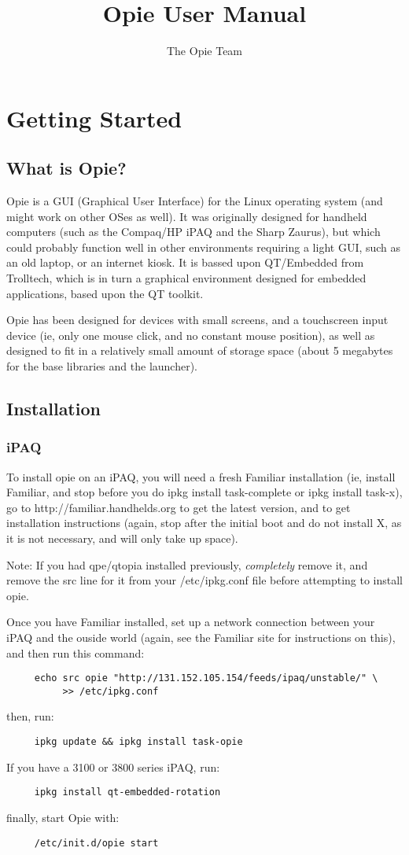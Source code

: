 \documentclass[12pt,letterpaper,oneside, openany]{book} \usepackage[latin1] {inputenc}
\title{Opie User Manual}
\author{The Opie Team}
\begin{document}
\maketitle
\tableofcontents
\part{Getting Started}
\chapter{What is Opie?}
Opie is a GUI (Graphical User Interface) for the Linux operating system (and might work on other OSes as well).  It was originally designed for handheld computers (such as the Compaq/HP iPAQ and the Sharp Zaurus), but which could probably function well in other environments requiring a light GUI, such as an old laptop, or an internet kiosk.  It is bassed upon QT/Embedded from Trolltech, which is in turn a graphical environment designed for embedded applications, based upon the QT toolkit.

Opie has been designed for devices with small screens, and a touchscreen input device (ie, only one mouse click, and no constant mouse position), as well as designed to fit in a relatively small amount of storage space (about 5 megabytes for the base libraries and the launcher).
\chapter{Installation}
\section{iPAQ}
To install opie on an iPAQ, you will need a fresh Familiar installation (ie, install Familiar, and stop before you do ipkg install task-complete or ipkg install task-x), go to http://familiar.handhelds.org to get the latest version, and to get installation instructions (again, stop after the initial boot and do not install X, as it is not necessary, and will only take up space).

Note: If you had qpe/qtopia installed previously, \emph{completely} remove it, and remove the src line for it from your /etc/ipkg.conf file before attempting to install opie.

Once you have Familiar installed, set up a network connection between your iPAQ and the ouside world (again, see the Familiar site for instructions on this), and then run this command:
\begin{verbatim}
     echo src opie "http://131.152.105.154/feeds/ipaq/unstable/" \
          >> /etc/ipkg.conf
\end{verbatim} 
then, run:
\begin{verbatim}
     ipkg update && ipkg install task-opie
\end{verbatim}
If you have a 3100 or 3800 series iPAQ, run:
\begin{verbatim}
     ipkg install qt-embedded-rotation
\end{verbatim}
finally, start Opie with:
\begin{verbatim}
     /etc/init.d/opie start
\end{verbatim}
\end{document}
